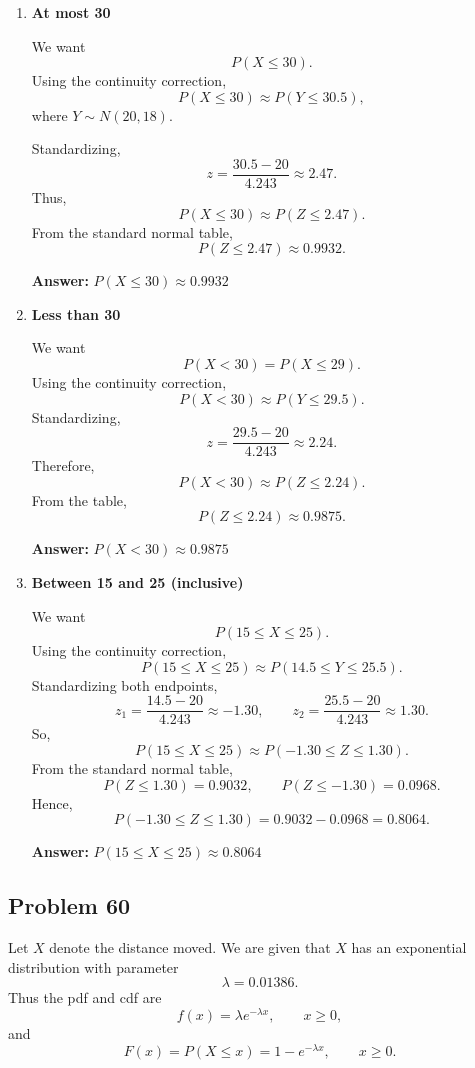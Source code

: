 \begin{enumerate}
    \item[(a)] \textbf{At most 30}

    We want
    \[
    P(X\le 30).
    \]
    Using the continuity correction,
    \[
    P(X\le 30)\approx P(Y\le 30.5),
    \]
    where $Y\sim N(20,18)$.

    Standardizing,
    \[
    z=\frac{30.5-20}{4.243}\approx 2.47.
    \]
    Thus,
    \[
    P(X\le 30)\approx P(Z\le 2.47).
    \]
    From the standard normal table,
    \[
    P(Z\le 2.47)\approx 0.9932.
    \]

    \textbf{Answer:} $P(X\le 30)\approx 0.9932$

    \item[(b)] \textbf{Less than 30}

    We want
    \[
    P(X<30)=P(X\le 29).
    \]
    Using the continuity correction,
    \[
    P(X<30)\approx P(Y\le 29.5).
    \]
    Standardizing,
    \[
    z=\frac{29.5-20}{4.243}\approx 2.24.
    \]
    Therefore,
    \[
    P(X<30)\approx P(Z\le 2.24).
    \]
    From the table,
    \[
    P(Z\le 2.24)\approx 0.9875.
    \]

    \textbf{Answer:} $P(X<30)\approx 0.9875$

    \item[(c)] \textbf{Between 15 and 25 (inclusive)}

    We want
    \[
    P(15\le X\le 25).
    \]
    Using the continuity correction,
    \[
    P(15\le X\le 25)\approx P(14.5\le Y\le 25.5).
    \]
    Standardizing both endpoints,
    \[
    z_1=\frac{14.5-20}{4.243}\approx -1.30,
    \qquad
    z_2=\frac{25.5-20}{4.243}\approx 1.30.
    \]
    So,
    \[
    P(15\le X\le 25)\approx P(-1.30\le Z\le 1.30).
    \]
    From the standard normal table,
    \[
    P(Z\le 1.30)=0.9032,
    \qquad
    P(Z\le -1.30)=0.0968.
    \]
    Hence,
    \[
    P(-1.30\le Z\le 1.30)=0.9032-0.0968=0.8064.
    \]

    \textbf{Answer:} $P(15\le X\le 25)\approx 0.8064$
\end{enumerate}

\subsection*{Problem 60}

Let $X$ denote the distance moved. We are given that $X$ has an exponential distribution with parameter
\[
\lambda=0.01386.
\]
Thus the pdf and cdf are
\[
f(x)=\lambda e^{-\lambda x}, \qquad x\ge 0,
\]
and
\[
F(x)=P(X\le x)=1-e^{-\lambda x}, \qquad x\ge 0.
\]

